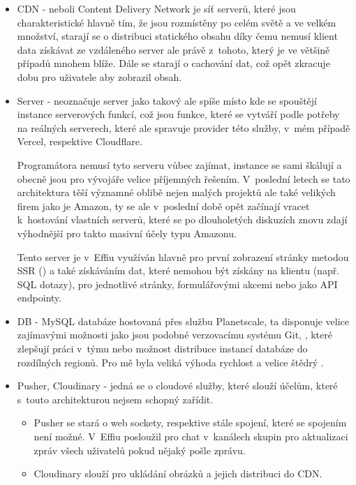 \documentclass[12pt, a4paper,
openright
]{report}
\begin{document}
	\begin{itemize}
		\item CDN - neboli Content Delivery Network je síť serverů, které jsou charakteristické hlavně tím, že jsou rozmístěny po celém světě a ve velkém množství, starají se o distribuci statického obsahu díky čemu nemusí klient data získávat ze vzdáleného server ale právě z~tohoto, který je ve většině případů mnohem blíže. Dále se starají o cachování dat, což opět zkracuje dobu pro uživatele aby zobrazil obsah.
		\item Server - neoznačuje server jako takový ale spíše místo kde se spouštějí instance serverových funkcí, což jsou funkce, které se vytváří podle potřeby na reálných serverech, které ale spravuje provider této služby, v~mém případě Vercel, respektive Cloudflare.
		
		Programátora nemusí tyto serveru vůbec zajímat, instance se sami škálují a obecně jsou pro vývojáře velice příjemných řešením. V~poslední letech se tato architektura těší významné oblibě nejen malých projektů ale také velikých firem jako je Amazon, ty se ale v~poslední době opět začínají vracet k~hostování vlastních serverů, které se po dlouholetých diskuzích znovu zdají výhodnější pro takto masivní účely typu Amazonu.
		
		Tento server je v~Effiu využíván hlavně pro první zobrazení stránky metodou SSR () a také získáváním dat, které nemohou být získány na klientu (např. SQL dotazy), pro jednotlivé stránky, formulářovými akcemi nebo jako API endpointy.
		
		\item DB - MySQL databáze hostovaná přes službu Planetscale, ta disponuje velice zajímavými možnosti jako jsou  podobné verzovacímu systému Git, , které zlepšují práci v~týmu nebo možnost distribuce  instancí databáze do rozdílných regionů. Pro mě byla veliká výhoda rychlost a velice štědrý .
		\item Pusher, Cloudinary - jedná se o cloudové služby, které slouží účelům, které s~touto architekturou nejsem schopný zařídit.
		
		\begin{itemize}
			\item Pusher se stará o web sockety, respektive stále spojení, které se  spojením není možné. V~Effiu posloužil pro chat v~kanálech skupin pro aktualizaci zpráv všech uživatelů pokud nějaký pošle zprávu.
			
			\item Cloudinary slouží pro ukládání obrázků a jejich distribuci do CDN.
		\end{itemize}
	\end{itemize}
\end{document}
